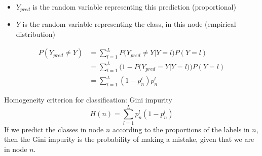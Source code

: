 \documentclass[usenames,dvipsnames]{beamer}
\begin{document}
\begin{frame}
    \begin{itemize}
	\item $Y_{pred}$ is the random variable representing this prediction (proportional)
	\item $Y$ is the random variable representing the class, in this node (empirical distribution)
    \end{itemize}
    \begin{equation}
        \begin{aligned}
            \label{eq:}
	    P(Y_{pred}\neq Y) &= \sum^{L}_{l=1} P\big(Y_{pred}\neq Y |Y=l\big)P(Y=l)\\
	    &= \sum^{L}_{l=1} \Big(1-P\big(Y_{pred}= Y |Y=l\big)\Big)P(Y=l)\\
	    &= \sum^{L}_{l=1} (1-p_n^l)p_n^l
        \end{aligned}
    \end{equation}
\end{frame}

\begin{frame}{Homogeneity criterion for classification: Gini impurity}
    \begin{equation}
	H(n) = \sum^{L}_{l=1} p_n^l(1-p_n^l)
    \end{equation}
    If we predict the classes in node $n$ according to the proportions of the labels in $n$, then the Gini impurity is the probability of making a mistake, given that we are in node $n$. 
\end{frame}
\end{document}
